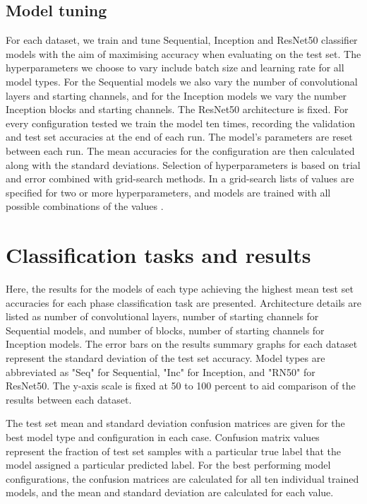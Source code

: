 \documentclass[12pt]{article}
\begin{document}
\subsection{Model tuning}
For each dataset, we train and tune Sequential, Inception and ResNet50 classifier models with the aim of maximising accuracy when evaluating on the test set. The hyperparameters we choose to vary include batch size and learning rate for all model types. For the Sequential models we also vary the number of convolutional layers and starting channels, and for the Inception models we vary the number Inception blocks and starting channels. The ResNet50 architecture is fixed. For every configuration tested we train the model ten times, recording the validation and test set accuracies at the end of each run. The model's parameters are reset between each run. The mean accuracies for the configuration are then calculated along with the standard deviations. Selection of hyperparameters is based on trial and error combined with grid-search methods. In a grid-search lists of values are specified for two or more hyperparameters, and models are trained with all possible combinations of the values \cite{Goodfellow16}.

\section{Classification tasks and results}
Here, the results for the models of each type achieving the highest mean test set accuracies for each phase classification task are presented. Architecture details are listed as number of convolutional layers, number of starting channels for Sequential models, and number of blocks, number of starting channels for Inception models. The error bars on the results summary graphs for each dataset represent the standard deviation of the test set accuracy. Model types are abbreviated as "Seq" for Sequential, "Inc" for Inception, and "RN50" for ResNet50. The y-axis scale is fixed at 50 to 100 percent to aid comparison of the results between each dataset.

The test set mean and standard deviation confusion matrices are given for the best model type and configuration in each case. Confusion matrix values represent the fraction of test set samples with a particular true label that the model assigned a particular predicted label. For the best performing model configurations, the confusion matrices are calculated for all ten individual trained models, and the mean and standard deviation are calculated for each value.
\end{document}
